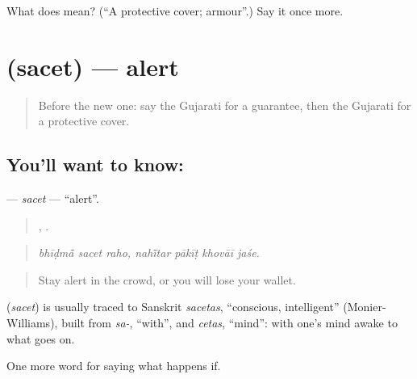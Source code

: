 \begin{tcolorbox}[breakable,colback=teal!4,colframe=teal!35!black,title={Before you move on}]
What does  mean? (\textquotedblleft{}A protective cover; armour\textquotedblright{}.) Say it once more.
\end{tcolorbox}
\section[\texorpdfstring{\gu{સચેત} (sacet)}{સચેત (sacet)}]{ (sacet) — alert}

\label{lesson:GU-C372-sacet}



\begin{quote}
Before the new one: say the Gujarati for a guarantee, then the Gujarati for a protective cover.
\end{quote}

\subsection*{You'll want to know: }
\textbf{} — \emph{sacet} — \textquotedblleft{}alert\textquotedblright{}.

\begin{quote}
  ,    .
\end{quote}

\begin{quote}
\emph{bhīḍmā̃ sacet raho, nahī̃tar pākīṭ khovāī jaśe.}
\end{quote}

\begin{quote}
Stay alert in the crowd, or you will lose your wallet.
\end{quote}

\begin{cousinweb}
\textbf{} (\emph{sacet}) is usually traced to Sanskrit \emph{sacetas}, \textquotedblleft{}conscious, intelligent\textquotedblright{} (Monier-Williams), built from \emph{sa-}, \textquotedblleft{}with\textquotedblright{}, and \emph{cetas}, \textquotedblleft{}mind\textquotedblright{}: with one's mind awake to what goes on.
\end{cousinweb}

\begin{grammarlens}[title={What you've built}]
One more word for saying what happens if.
\end{grammarlens}

